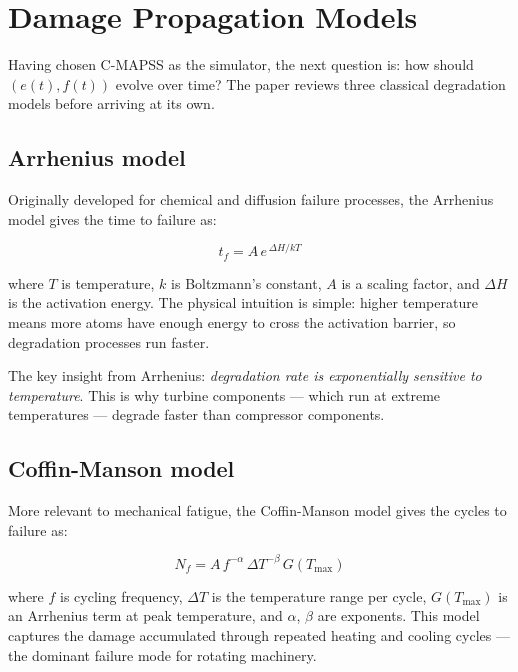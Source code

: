 \documentclass[11pt, a4paper]{article}
\begin{document}
\section{Damage Propagation Models}

Having chosen C-MAPSS as the simulator, the next question is: how should
$(e(t), f(t))$ evolve over time? The paper reviews three classical
degradation models before arriving at its own.

\subsection{Arrhenius model}

Originally developed for chemical and diffusion failure processes, the
Arrhenius model gives the time to failure as:

\begin{equation}
  t_f = A \, e^{\,\Delta H / kT}
  \label{eq:arrhenius}
\end{equation}

where $T$ is temperature, $k$ is Boltzmann's constant, $A$ is a scaling
factor, and $\Delta H$ is the activation energy. The physical intuition
is simple: higher temperature means more atoms have enough energy to
cross the activation barrier, so degradation processes run faster.

The key insight from Arrhenius: \emph{degradation rate is exponentially
sensitive to temperature}. This is why turbine components --- which run
at extreme temperatures --- degrade faster than compressor components.

\subsection{Coffin-Manson model}

More relevant to mechanical fatigue, the Coffin-Manson model gives the
cycles to failure as:

\begin{equation}
  N_f = A \, f^{-\alpha} \, \Delta T^{-\beta} \, G(T_{\max})
  \label{eq:coffinmanson}
\end{equation}

where $f$ is cycling frequency, $\Delta T$ is the temperature range
per cycle, $G(T_{\max})$ is an Arrhenius term at peak temperature,
and $\alpha$, $\beta$ are exponents. This model captures the damage
accumulated through repeated heating and cooling cycles --- the
dominant failure mode for rotating machinery.
\end{document}

